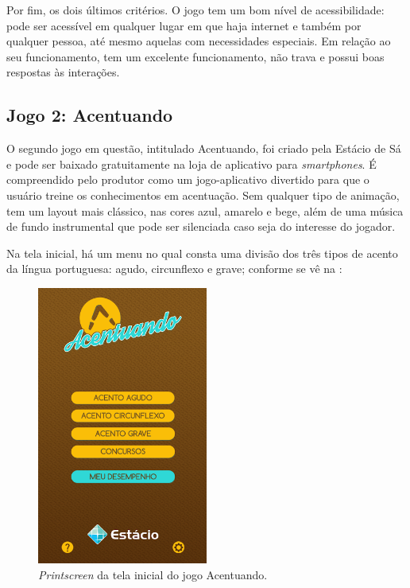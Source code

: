 \documentclass{textolivre}
\begin{document}
Por fim, os dois últimos critérios. O jogo tem um bom nível de acessibilidade: pode ser acessível em qualquer lugar em que haja internet e também por qualquer pessoa, até mesmo aquelas com necessidades especiais. Em relação ao seu funcionamento, tem um excelente funcionamento, não trava e possui boas respostas às interações.

\subsection{Jogo 2: Acentuando}
O segundo jogo em questão, intitulado Acentuando, foi criado pela Estácio de Sá e pode ser baixado gratuitamente na loja de aplicativo para \emph{smartphones}. É compreendido pelo produtor como um jogo-aplicativo divertido para que o usuário treine os conhecimentos em acentuação. Sem qualquer tipo de animação, tem um layout mais clássico, nas cores azul, amarelo e bege, além de uma música de fundo instrumental que pode ser silenciada caso seja do interesse do jogador.

Na tela inicial, há um menu no qual consta uma divisão dos três tipos de acento da língua portuguesa: agudo, circunflexo e grave; conforme se vê na :

\begin{figure}[htbp]
 \centering
 \includegraphics[width=0.5\textwidth]{fig3.png}
 \caption{\emph{Printscreen} da tela inicial do jogo Acentuando.}
 \label{fig3}
\end{figure}
\end{document}

